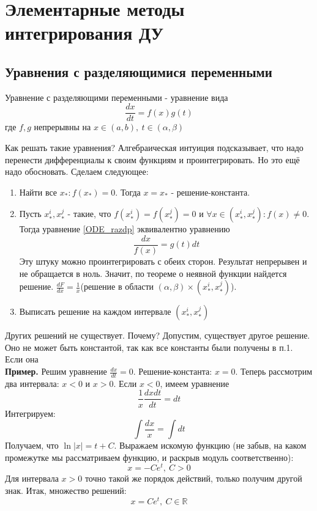\section{Элементарные методы интегрирования ДУ}
\subsection{Уравнения с разделяющимися переменными}
\begin{defin}
Уравнение с разделяющими переменными - уравнение вида
\begin{equation}
    \frac{dx}{dt}=f(x)g(t) \label{ODE_razdp}
\end{equation}
где $f,g$ непрерывны на  $x\in(a,b),~t\in(\alpha,\beta)$
\end{defin}
Как решать такие уравнения? Алгебраическая интуиция подсказывает, что надо 
перенести 
дифференциалы к своим функциям и проинтегрировать. Но это ещё надо обосновать.
Сделаем следующее:\\
\begin{enumerate}
    \item Найти все $x_*:f(x_*)=0$. Тогда $x=x_*$ - решение-константа. 
    \item Пусть  $x^i_*,x^j_*$ - такие, что  $f(x^i_*)=f(x^j_*)=0$ и
    $\forall x\in(x^i_*,x^j_*):f(x)\ne0$. Тогда уравнение \ref{ODE_razdp}
эквивалентно уравнению 
$$\frac{dx}{f(x)}=g(t)dt$$
Эту штуку можно проинтегрировать с обеих сторон. Результат непрерывен и не
обращается в ноль. Значит, по теореме о неявной функции найдется решение. 
$\frac{dF}{dx}=\frac{1}{x}$(решение в области $(\alpha,\beta)\times
(x^i_*,x^j_*)$).
    \item Выписать решение на каждом интервале $(x^i_*,x^j_*)$
\end{enumerate}
Других решений не существует. Почему? Допустим, существует другое решение.
Оно не может быть константой, так как все константы были получены в п.1.
Если она \\
\textbf{Пример.} Решим уравнение $\frac{dx}{dt}=0$. Решение-константа: $x=0$.
Теперь рассмотрим два интервала: $x<0$ и  $x>0$. Если  $x<0$, имеем уравнение
 $$\frac{1}{x}\frac{dxdt}{dt}=dt$$
 Интегрируем:
 $$\int\frac{dx}{x}=\int dt$$
 Получаем, что $\ln|x|=t+C$. Выражаем искомую функцию (не забыв, на каком
 промежутке мы рассматриваем функцию, и раскрыв модуль соответственно):
 $$x=-Ce^t,~C>0$$
Для интервала $x>0$ точно такой же порядок действий, только получим другой 
знак. Итак, множество решений:
$$x=Ce^t,~C\in\mathbb{R}$$
